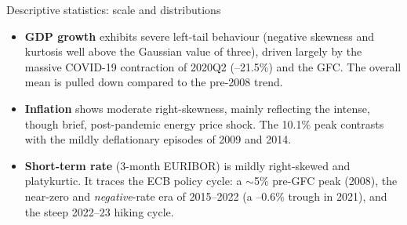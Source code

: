 \documentclass[9pt]{beamer}
\begin{document}
\begin{frame}{Descriptive statistics: scale and distributions}
\label{slide:descriptive}

{\footnotesize
\setlength{\tabcolsep}{4pt}

}

{\footnotesize
\begin{itemize}
    \item \textbf{GDP growth} exhibits severe left-tail behaviour (negative skewness and kurtosis well above the Gaussian value of three), driven largely by the massive COVID-19 contraction of 2020Q2 (--21.5\%) and the GFC. The overall mean is pulled down compared to the pre-2008 trend.

    \item \textbf{Inflation} shows moderate right-skewness, mainly reflecting the intense, though brief, post-pandemic energy price shock. The 10.1\% peak contrasts with the mildly deflationary episodes of 2009 and 2014.

    \item \textbf{Short-term rate} (3-month EURIBOR) is mildly right-skewed and platykurtic. It traces the ECB policy cycle: a $\sim$5\% pre-GFC peak (2008), the near-zero and \emph{negative}-rate era of 2015--2022 (a --0.6\% trough in 2021), and the steep 2022--23 hiking cycle.
\end{itemize}
}

\end{frame}
\end{document}
